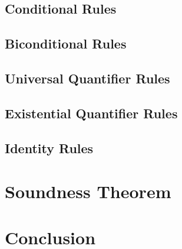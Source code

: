 \subsection{Conditional Rules}%
  \label{sub:ConditionalRules}
  




\subsection{Biconditional Rules}%
  \label{sub:BiconditionalRules}
  




\subsection{Universal Quantifier Rules}%
  \label{sub:UniversalRules}
  




\subsection{Existential Quantifier Rules}%
  \label{sub:ExistentialRules}
 




\subsection{Identity Rules}%
  \label{sub:IdentityRules}
  




\section{Soundness Theorem}%
  \label{sec:SoundnessTheorem}
  



\section{Conclusion}%
  \label{sec:Conclusion}
  



\iffalse

\practiceproblems

